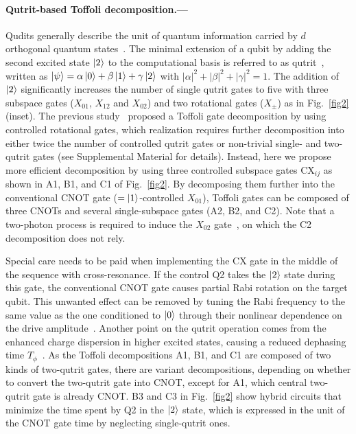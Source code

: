 \documentclass[aps,prl,twocolumn,groupedaddress,superscriptaddress]{revtex4}
\begin{document}
\paragraph{Qutrit-based Toffoli decomposition.---}
Qudits generally describe the unit of quantum information carried by $d$ orthogonal quantum states~\cite{wang2020}.
The minimal extension of a qubit by adding the second excited state $\ket{2}$ to the computational basis is referred to as qutrit~\cite{di2012}, written as $\ket{\psi} = \alpha \ket{0} + \beta \ket{1} + \gamma \ket{2}$
with $\left| \alpha \right|^2 + \left| \beta \right|^2 + \left| \gamma \right|^2 = 1$.
The addition of $\ket{2}$ significantly increases the number of single qutrit gates to five with three subspace gates ($X_{01}$, $X_{12}$ and $X_{02}$) and two rotational gates ($X_{\pm}$) as in Fig.~\ref{fig2}(inset).
The previous study~\cite{gokhale2019} proposed a Toffoli gate decomposition by using controlled rotational gates, which realization requires further decomposition into either twice the number of controlled qutrit gates or non-trivial single- and two-qutrit gates (see Supplemental Material for details).
Instead, here we propose more efficient decomposition by using three controlled subspace gates CX$_{ij}$ as shown in A1, B1, and C1 of Fig.~\ref{fig2}.
By decomposing them further into the conventional CNOT gate ($=\ket{1}$-controlled $X_{01}$), Toffoli gates can be composed of three CNOTs and several single-subspace gates (A2, B2, and C2).
Note that a two-photon process is required to induce the $X_{02}$ gate~\cite{yurtalan2020}, on which the C2 decomposition does not rely.

Special care needs to be paid when implementing the CX gate in the middle of the sequence with cross-resonance.
If the control Q2 takes the $\ket{2}$ state during this gate, the conventional CNOT gate causes partial Rabi rotation on the target qubit.
This unwanted effect can be removed by tuning the Rabi frequency to the same value as the one conditioned to $\ket{0}$ through their nonlinear dependence on the drive amplitude~\cite{blok2021,tripathi2019,magesan2020}.
Another point on the qutrit operation comes from the enhanced charge dispersion in higher excited states, causing a reduced dephasing time $T_\phi$~\cite{koch2007}.
As the Toffoli decompositions A1, B1, and C1 are composed of two kinds of two-qutrit gates, there are variant decompositions, depending on whether to convert the two-qutrit gate into CNOT, except for A1, which central two-qutrit gate is already CNOT.
B3 and C3 in Fig.~\ref{fig2} show hybrid circuits that minimize the time spent by Q2 in the $\ket{2}$ state, which is expressed in the unit of the CNOT gate time by neglecting single-qutrit ones.
\end{document}
